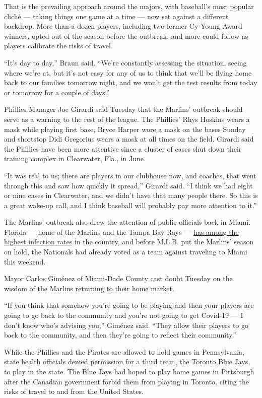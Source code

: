 That is the prevailing approach around the majors, with baseball's most
popular cliché --- taking things one game at a time --- now set against
a different backdrop. More than a dozen players, including two former Cy
Young Award winners, opted out of the season before the outbreak, and
more could follow as players calibrate the risks of travel.

``It's day to day,'' Braun said. ``We're constantly assessing the
situation, seeing where we're at, but it's not easy for any of us to
think that we'll be flying home back to our families tomorrow night, and
we won't get the test results from today or tomorrow for a couple of
days.''

Phillies Manager Joe Girardi said Tuesday that the Marlins' outbreak
should serve as a warning to the rest of the league. The Phillies' Rhys
Hoskins wears a mask while playing first base, Bryce Harper wore a mask
on the bases Sunday and shortstop Didi Gregorius wears a mask at all
times on the field. Girardi said the Phillies have been more attentive
since a cluster of cases shut down their training complex in Clearwater,
Fla., in June.

``It was real to us; there are players in our clubhouse now, and
coaches, that went through this and saw how quickly it spread,'' Girardi
said. ``I think we had eight or nine cases in Clearwater, and we didn't
have that many people there. So this is a great wake-up call, and I
think baseball will probably pay more attention to it.''

The Marlins' outbreak also drew the attention of public officials back
in Miami. Florida --- home of the Marlins and the Tampa Bay Rays ---
\href{https://www.nytimes.com/interactive/2020/us/florida-coronavirus-cases.html}{has
among the highest infection rates} in the country, and before M.L.B. put
the Marlins' season on hold, the Nationals had already voted as a team
against traveling to Miami this weekend.

Mayor Carlos Giménez of Miami-Dade County cast doubt Tuesday on the
wisdom of the Marlins returning to their home market.

``If you think that somehow you're going to be playing and then your
players are going to go back to the community and you're not going to
get Covid-19 --- I don't know who's advising you,'' Giménez said. ``They
allow their players to go back to the community, and then they're going
to reflect their community.''

While the Phillies and the Pirates are allowed to hold games in
Pennsylvania, state health officials denied permission for a third team,
the Toronto Blue Jays, to play in the state. The Blue Jays had hoped to
play home games in Pittsburgh after the Canadian government forbid them
from playing in Toronto, citing the risks of travel to and from the
United States.


